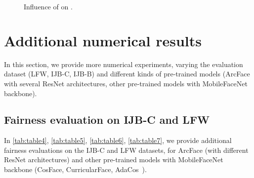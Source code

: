 \documentclass[nohyperref]{article}
\theoremstyle{plain}
\theoremstyle{definition}
\theoremstyle{remark}
\begin{document}
\begin{figure}[h]
    \centering
     \hspace{2cm}
   \caption{Influence of  on .}    \label{fig:kappa_f_influence_FRR_a(t)}
\end{figure}

\clearpage

\section{Additional numerical results}\label{app:additional_results}

In this section, we provide more numerical experiments, varying the evaluation dataset (LFW, IJB-C, IJB-B) and different kinds of pre-trained models (ArcFace with several ResNet architectures, other pre-trained models with MobileFaceNet backbone).



\subsection{Fairness evaluation on IJB-C and LFW}

In \autoref{tab:table4}, \autoref{tab:table5}, \autoref{tab:table6}, \autoref{tab:table7}, we provide additional fairness evaluations on the IJB-C and LFW datasets, for ArcFace (with different ResNet architectures) and other pre-trained models with MobileFaceNet backbone (CosFace, CurricularFace, AdaCos~\cite{adacos}).
\end{document}
